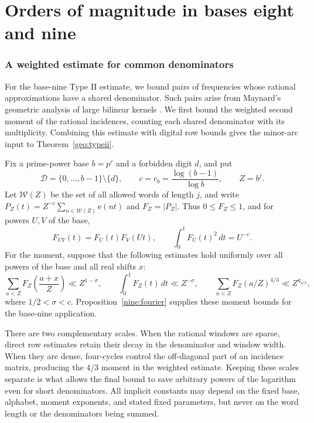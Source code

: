 \documentclass[11pt,a4paper]{article}
\theoremstyle{paperplain}
\numberwithin{equation}{section}
\begin{document}
\part{Orders of magnitude in bases eight and nine}

\section{A weighted estimate for common denominators}\label{geo:section}

For the base-nine Type II estimate, we bound pairs of frequencies
whose rational approximations have a shared denominator. Such pairs
arise from Maynard's geometric analysis of large bilinear kernels
\cite[Lemmas~13.2 and~14.1]{Maynard2019}. We first bound the weighted
second moment of the rational incidences, counting each shared
denominator with its multiplicity. Combining this estimate with
digital row bounds gives the minor-arc input to
Theorem~\ref{geo:typeii}.

Fix a prime-power base $b=p^r$ and a forbidden digit $d$, and put
\[
 \mathcal D=\{0,\ldots,b-1\}\setminus\{d\},\qquad
 c=c_b=\frac{\log(b-1)}{\log b},\qquad Z=b^j.
\]
Let $\mathcal W(Z)$ be the set of all allowed words of length $j$, and write
$P_Z(t)=Z^{-c}\sum_{n\in\mathcal W(Z)}\mathrm e(nt)$ and $F_Z=|P_Z|$.
Thus $0\le F_Z\le1$, and for powers $U,V$ of the base,
\begin{equation}\label{geo:product}
 F_{UV}(t)=F_U(t)F_V(Ut),\qquad
 \int_0^1 F_U(t)^2\,dt=U^{-c}.
\end{equation}
For the moment, suppose that the following estimates hold uniformly over all
powers of the base and all real shifts $x$:
\begin{equation}\label{geo:moments}
 \sum_{a<Z}F_Z\left(\frac{a+x}{Z}\right)\ll Z^{1-\sigma},
 \qquad \int_0^1F_Z(t)\,dt\ll Z^{-\sigma},
 \qquad \sum_{a<Z}F_Z(a/Z)^{4/3}\ll Z^{g_{4/3}},
\end{equation}
where $1/2<\sigma<c$. Proposition~\ref{nine:fourier} supplies these
moment bounds for the base-nine application.

There are two complementary scales. When the rational windows are sparse,
direct row estimates retain their decay in the denominator and window width.
When they are dense, four-cycles control the off-diagonal part of an incidence
matrix, producing the $4/3$ moment in the weighted estimate. Keeping these
scales separate is what allows the final bound to save arbitrary powers of
the logarithm even for short denominators. All implicit constants may depend
on the fixed base, alphabet, moment exponents, and stated fixed parameters,
but never on the word length or the denominators being summed.
\end{document}
